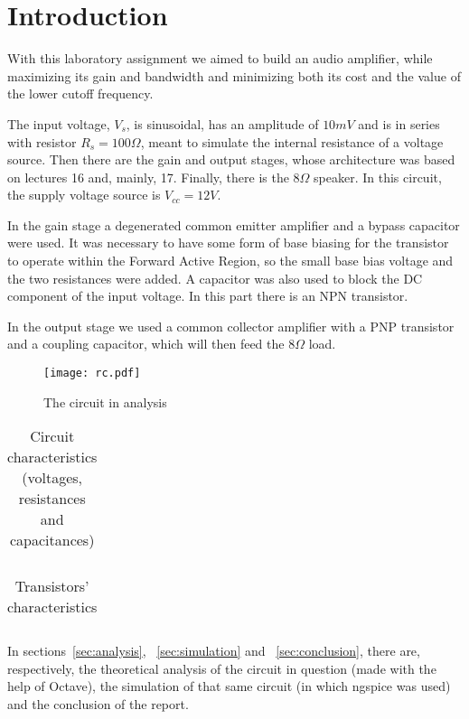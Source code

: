 \section{Introduction}
\label {sec:introduction}


With this laboratory assignment we aimed to build an audio amplifier, while maximizing its gain and bandwidth and minimizing both its cost and the value of the lower cutoff frequency.

The input voltage, $V_s$, is sinusoidal, has an amplitude of $10 mV$ and is in series with resistor $R_s=100 \Omega$, meant to simulate the internal resistance of a voltage source. Then there are the gain and output stages, whose architecture was based on lectures 16 and, mainly, 17. Finally, there is the $8 \Omega$ speaker. In this circuit, the supply voltage source is $V_{cc}=12 V$.

In the gain stage a degenerated common emitter amplifier and a bypass capacitor were used.  It was necessary to have some form of base biasing for the transistor to operate within the Forward Active Region, so the small base bias voltage and the two resistances were added. A capacitor was also used to block the DC component of the input voltage. In this part there is an NPN transistor.

In the output stage we used a common collector amplifier with a PNP transistor and a coupling capacitor, which will then feed the $8 \Omega$ load.



\begin{figure}[H] \centering
\texttt{[image: rc.pdf]}
\caption{The circuit in analysis}
\label{fig:circuit}
\end{figure}


\begin{table}[H]
  \centering
  \begin{tabular}{|c|c|}
    \hline
      
  \end{tabular}
  \caption{Circuit characteristics (voltages, resistances and capacitances)}
  \label{tab:resistance}
\end{table}

\begin{table}[H]
  \centering
  \begin{tabular}{|c|c|}
    \hline
      
  \end{tabular}
  \caption{Transistors' characteristics}
  \label{tab:resistance1}
\end{table}

In sections~\ref{sec:analysis}, ~\ref{sec:simulation} and ~\ref{sec:conclusion}, there are, respectively, the theoretical analysis of the circuit in question (made with the help of Octave), the simulation of that same circuit (in which ngspice was used) and the conclusion of the report.
